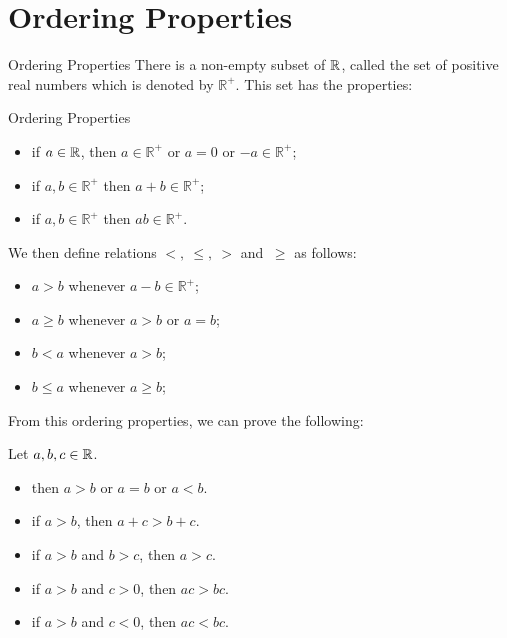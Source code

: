 \documentclass{beamer}
\def\Rp{\mathbb{R}^{+}}
\begin{document}
\section{Ordering Properties}
\begin{frame}{Ordering Properties}
  There is a non-empty subset of $\R$, called
  the set of positive real numbers which is denoted
  by $\Rp$. This set has the properties:
  \begin{block}{Ordering Properties}
    \begin{itemize}
      \item if $a\in\R$, then $a\in\Rp$ or $a=0$ or $-a\in\Rp$;
      \item if $a,b\in\Rp$ then $a+b\in\Rp$;
      \item if $a,b\in\Rp$ then $ab\in\Rp$.
    \end{itemize}
  \end{block}

  We then define relations $<,~\leq,~>$ and $~\geq$  as follows: 
  \begin{itemize}
    \item $a>b$ whenever $a-b\in\Rp$;
    \item $a\geq b$ whenever $a>b$ or $a=b$;
    \item $b<a$ whenever $a>b$;
    \item $b\leq a$ whenever $a\geq b$;
  \end{itemize}
\end{frame}

\begin{frame}
  From this ordering properties, we can prove the following:
  \begin{lemma}
    Let $a,b,c\in\R$.
    \begin{itemize}
      \item then $a>b$ or $a=b$ or $a<b$.
      \item if $a>b$, then $a+c>b+c$.
      \item if $a>b$ and $b>c$, then $a>c$.
      \item if $a>b$ and $c>0$, then $ac>bc$.
      \item if $a>b$ and $c<0$, then $ac<bc$.
    \end{itemize}
  \end{lemma}
\end{frame}

\end{document}
